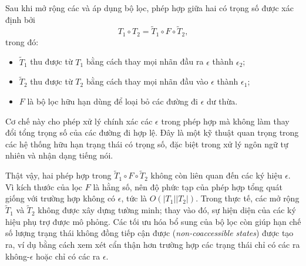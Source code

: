 Sau khi mở rộng các 
và áp dụng bộ lọc,
phép hợp giữa hai 
có trọng số được xác định bởi
\begin{equation}
T_1 \circ T_2
=
\tilde{T}_1 \circ F \circ \tilde{T}_2,
\end{equation}
trong đó:
\begin{itemize}
    \item $\tilde{T}_1$ thu được từ $T_1$
    bằng cách thay mọi nhãn đầu ra $\epsilon$
    thành $\epsilon_2$;
    \item $\tilde{T}_2$ thu được từ $T_2$
    bằng cách thay mọi nhãn đầu vào $\epsilon$
    thành $\epsilon_1$;
    \item $F$ là bộ lọc hữu hạn
    dùng để loại bỏ các đường đi $\epsilon$
    dư thừa.
\end{itemize}

Cơ chế này cho phép xử lý chính xác
các  $\epsilon$
trong phép hợp
mà không làm thay đổi tổng trọng số
của các đường đi hợp lệ.
Đây là một kỹ thuật quan trọng
trong các hệ thống
 hữu hạn trạng thái có trọng số,
đặc biệt trong xử lý ngôn ngữ tự nhiên
và nhận dạng tiếng nói.


Thật vậy, hai phép hợp trong 
$\tilde{T}_1 \circ F \circ \tilde{T}_2$
không còn liên quan đến các ký hiệu $\epsilon$. Vì kích thước của  lọc $F$ là hằng số, nên độ phức tạp của phép hợp tổng quát giống với trường hợp không có $\epsilon$, tức là $O(|T_1||T_2|)$.
Trong thực tế, các  mở rộng $\tilde{T}_1$ và $\tilde{T}_2$ không được xây dựng tường minh; thay vào đó, sự hiện diện của các ký hiệu phụ trợ được mô phỏng.
Các tối ưu hóa bổ sung của bộ lọc còn giúp hạn chế số lượng trạng thái không đồng tiếp cận được (\textit{non-coaccessible states}) được tạo ra, ví dụ bằng cách xem xét cẩn thận hơn trường hợp các trạng thái chỉ có các  ra không-$\epsilon$ hoặc chỉ có các  ra $\epsilon$.